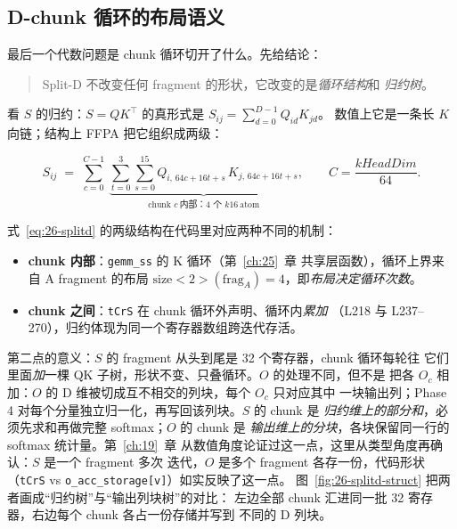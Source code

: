 \subsection{D-chunk 循环的布局语义}

最后一个代数问题是 chunk 循环切开了什么。先给结论：

\begin{quote}
  Split-D 不改变任何 fragment 的形状，它改变的是\emph{循环结构}和
  \emph{归约树}。
\end{quote}

看 $S$ 的归约：$S = QK^{\top}$ 的真形式是 $S_{ij} = \sum_{d=0}^{D-1}Q_{id}K_{jd}$。
数值上它是一条长 $K$ 向链；结构上 FFPA 把它组织成两级：

\begin{equation}
  S_{ij} \;=\; \sum_{c=0}^{C-1}\ \underbrace{\sum_{t=0}^{3}\sum_{s=0}^{15}
  Q_{i,\,64c+16t+s}\,K_{j,\,64c+16t+s}}_{\text{chunk } c\ \text{内部：4 个 } k16\ \text{atom}} ,
  \qquad C = \frac{kHeadDim}{64} .
  \label{eq:26-splitd}
\end{equation}

式~\eqref{eq:26-splitd} 的两级结构在代码里对应两种不同的机制：

\begin{itemize}[itemsep=2pt,topsep=2pt]
  \item \textbf{chunk 内部}：\texttt{gemm\_ss} 的 K 循环（第~\ref{ch:25}~章
        共享层函数），循环上界来自 A fragment 的布局
        $\mathrm{size}<2>(\mathrm{frag}_A)=4$，即\emph{布局决定循环次数}。
  \item \textbf{chunk 之间}：\texttt{tCrS} 在 chunk 循环外声明、循环内\emph{累加}
        （L218 与 L237--270），归约体现为同一个寄存器数组跨迭代存活。
\end{itemize}

第二点的意义：$S$ 的 fragment 从头到尾是 32 个寄存器，chunk 循环每轮往
它们里面\emph{加}一棵 QK 子树，形状不变、只叠循环。$O$ 的处理不同，但不是
把各 $O_c$ 相加：$O$ 的 D 维被切成互不相交的列块，每个 $O_c$ 只对应其中
一块输出列；Phase 4 对每个分量独立归一化，再写回该列块。$S$ 的 chunk 是
\emph{归约维上的部分和}，必须先求和再做完整 softmax；$O$ 的 chunk 是
\emph{输出维上的分块}，各块保留同一行的 softmax 统计量。第~\ref{ch:19}~章
从数值角度论证过这一点，这里从类型角度再确认：$S$ 是一个 fragment 多次
迭代，$O$ 是多个 fragment 各存一份，代码形状（\texttt{tCrS} vs
\texttt{o\_\allowbreak{}acc\_\allowbreak{}storage[v]}）如实反映了这一点。
图~\ref{fig:26-splitd-struct} 把两者画成“归约树”与“输出列块树”的对比：
左边全部 chunk 汇进同一批 32 寄存器，右边每个 chunk 各占一份存储并写到
不同的 D 列块。

